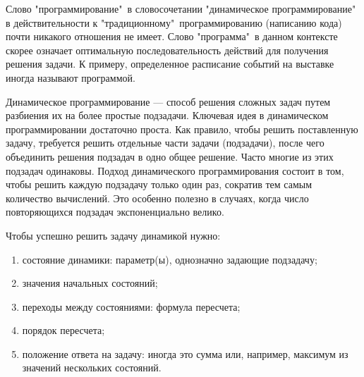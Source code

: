 \documentclass[12pt, a4paper]{article}
\begin{document}
	Слово "программирование"\, в словосочетании "динамическое программирование"\, в действительности к "традиционному"\, программированию (написанию кода) почти никакого отношения не имеет. Слово "программа"\, в данном контексте скорее означает оптимальную последовательность действий для получения решения задачи. К примеру, определенное расписание событий на выставке иногда называют программой.
	
	Динамическое программирование --- способ решения сложных задач путем разбиения их на более простые подзадачи. Ключевая идея в динамическом программировании достаточно проста. Как правило, чтобы решить поставленную задачу, требуется решить отдельные части задачи (подзадачи), после чего объединить решения подзадач в одно общее решение. Часто многие из этих подзадач одинаковы. Подход динамического программирования состоит в том, чтобы решить каждую подзадачу только один раз, сократив тем самым количество вычислений. Это особенно полезно в случаях, когда число повторяющихся подзадач экспоненциально велико.
	
	
	Чтобы успешно решить задачу динамикой нужно:
	\begin{enumerate}
		\item состояние динамики: параметр(ы), однозначно задающие подзадачу;
		\item значения начальных состояний;
		\item переходы между состояниями: формула пересчета;
		\item порядок пересчета;
		\item положение ответа на задачу: иногда это сумма или, например, максимум из значений нескольких состояний.
	\end{enumerate}
	
\end{document}
